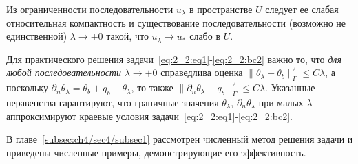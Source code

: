 \begin{remark}
    Из ограниченности последовательности $u_\lambda$
    в пространстве $U$ следует
    ее слабая относительная компактность и существование последовательности
    (возможно не единственной) $\lambda\to+0$ такой, что
    $u_\lambda \rightarrow u_*$ слабо в $U$.
\end{remark}

Для практического решения задачи~\eqref{eq:2_2:eq1}-\eqref{eq:2_2:bc2} важно то,
что \textit{для любой последовательности} $\lambda\to+0$ справедлива оценка
$\|\theta_\lambda -\theta_b\|^2_\Gamma\leq C\lambda$,
а поскольку $\partial_n\theta_\lambda=\theta_b+q_b-\theta_\lambda$,
то также $\|\partial_n\theta_\lambda-q_b\|^2_\Gamma\leq C\lambda$.
Указанные неравенства гарантируют, что граничные значения
$\theta_\lambda,\,\partial_n\theta_\lambda$ при малых $\lambda$
аппроксимируют краевые условия задачи~\eqref{eq:2_2:eq1}-\eqref{eq:2_2:bc2}.

В главе~\ref{subsec:ch4/sec4/subsec1} рассмотрен численный метод решения задачи
и приведены численные примеры, демонстрирующие его эффективность.
